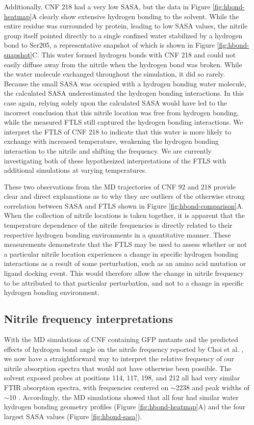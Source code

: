 Additionally, CNF 218 had a very low SASA, but the data in Figure \ref{fig:hbond-heatmap}A clearly show extensive hydrogen bonding to the solvent.
While the entire residue was surrounded by protein, leading to low SASA values, the nitrile group itself pointed directly to a single confined water stabilized by a hydrogen bond to Ser205, a representative snapshot of which is shown in Figure \ref{fig:hbond-snapshot}C.
This water formed hydrogen bonds with CNF 218 and could not easily diffuse away from the nitrile when the hydrogen bond was broken.
While the water molecule exchanged throughout the simulation, it did so rarely.
Because the small SASA was occupied with a hydrogen bonding water molecule, the calculated SASA underestimated the hydrogen bonding interactions.
In this case again, relying solely upon the calculated SASA would have led to the incorrect conclusion that this nitrile location was free from hydrogen bonding, while the measured FTLS still captured the hydrogen bonding interactions.
We interpret the FTLS of CNF 218 to indicate that this water is more likely to exchange with increased temperature, weakening the hydrogen bonding interaction to the nitrile and shifting the frequency.
We are currently investigating both of these hypothesized interpretations of the FTLS with additional simulations at varying temperatures.

These two observations from the MD trajectories of CNF 92 and 218 provide clear and direct explanations as to why they are outliers of the otherwise strong correlation between SASA and FTLS shown in Figure \ref{fig:hbond-comparison}A.
When the collection of nitrile locations is taken together, it is apparent that the temperature dependence of the nitrile frequencies is directly related to their respective hydrogen bonding environments in a quantitative manner.
These measurements demonstrate that the FTLS may be used to assess whether or not a particular nitrile location experiences a change in specific hydrogen bonding interactions as a result of some perturbation, such as an amino acid mutation or ligand docking event.
This would therefore allow the change in nitrile frequency to be attributed to that particular perturbation, and not to a change in specific hydrogen bonding environment.

\subsection{Nitrile frequency interpretations}

With the MD simulations of CNF containing GFP mutants and the predicted effects of hydrogen bond angle on the nitrile frequency reported by Choi et al. \cite{Choi2008}, we now have a straightforward way to interpret the relative frequency of our nitrile absorption spectra that would not have otherwise been possible.
The solvent exposed probes at positions 114, 117, 198, and 212 all had very similar FTIR absorption spectra, with frequencies centered on $\sim$2238 \si{\wn} and peak widths of $\sim$10 \si{\wn}.
Accordingly, the MD simulations showed that all four had similar water hydrogen bonding geometry profiles (Figure \ref{fig:hbond-heatmap}A) and the four largest SASA values (Figure \ref{fig:hbond-sasa}).

